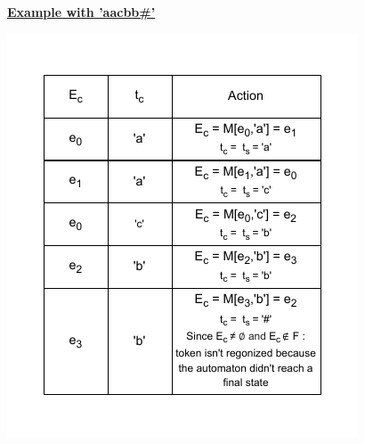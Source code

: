 \vspace{2cm}

\textbf{\underline{Example with 'aacbb\#'}}
\begin{center} 
    \includegraphics[height=0.5\textheight]{Exercices/EX2/ex2.3.ex.drawio.pdf}
\end{center}

